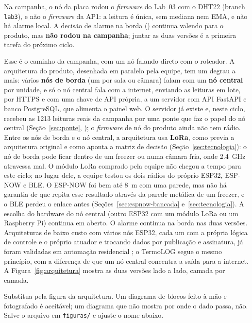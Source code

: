 Na campanha, o nó da placa rodou o \emph{firmware} do Lab~03 com o
DHT22 (branch \texttt{lab3}), e não o \emph{firmware} da AP1: a leitura
é única, sem mediana nem EMA, e não há alarme local. A decisão de alarme
na borda () continua valendo para o produto, mas \textbf{não rodou
na campanha}; juntar as duas versões é a primeira tarefa do próximo
ciclo.

Esse é o caminho da campanha, com um nó falando direto com o roteador. A
arquitetura do produto, desenhada em paralelo pela equipe, tem um degrau
a mais: vários \textbf{nós de
borda} (um por sala ou câmara) falam com um \textbf{nó central} por
unidade, e só o nó central fala com a internet, enviando as leituras em
lote, por HTTPS e com uma chave de API própria, a um servidor com API
FastAPI e banco PostgreSQL, que alimenta o painel web. O servidor já
existe e, neste ciclo, recebeu as \num{1213} leituras reais da campanha
por uma ponte que faz o papel do nó central (Seção~\ref{sec:ponte},
); o \emph{firmware} de nó do produto ainda não tem rádio. Entre
os nós de borda e o nó central, a arquitetura usa \textbf{LoRa}, como
previa a arquitetura original e como aponta a matriz de decisão
(Seção~\ref{sec:tecnologia}): o nó de borda pode ficar dentro de um
freezer ou numa câmara fria, onde \SI{2,4}{\giga\hertz} atravessa mal. O
módulo LoRa comprado pela equipe não chegou a tempo para este ciclo; no
lugar dele, a equipe testou os dois rádios do próprio ESP32, ESP-NOW e
BLE. O ESP-NOW foi bem até \SI{8}{\metre} com uma parede, mas não há
garantia de que repita esse resultado através da parede metálica de um
freezer, e o BLE perdeu o enlace antes
(Seções~\ref{sec:espnow-bancada} e~\ref{sec:tecnologia}). A escolha do
hardware do nó central (outro ESP32 com um módulo LoRa ou um
Raspberry Pi) continua em aberto. O alarme continua na borda nas duas
versões. Arquiteturas de baixo custo com vários nós ESP32, cada um com a
própria lógica de controle e o próprio atuador e trocando dados por
publicação e assinatura, já foram validadas em automação residencial
\cite{perezayala2025esp32}; o TermoLOG segue o mesmo princípio, com a
diferença de que um nó central concentra a saída para a internet. A Figura~\ref{fig:arquitetura} mostra as duas versões lado a
lado, camada por camada.

\begin{orientacao}
Substitua pela figura da arquitetura. Um diagrama de blocos feito à mão
e fotografado é aceitável; um diagrama que não mostra por onde o dado
passa, não. Salve o arquivo em \texttt{figuras/} e ajuste o nome abaixo.
\end{orientacao}

